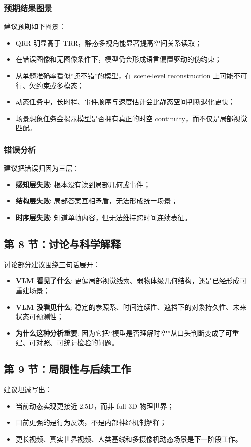 \documentclass[UTF8,12pt,fontset=none]{ctexart}
\begin{document}
\subsubsection{预期结果图景}
建议预期如下图景：
\begin{itemize}
  \item QRR 明显高于 TRR，静态多视角能显著提高空间关系读取；
  \item 在错误图像和无图像条件下，模型仍会形成语言偏置驱动的伪约束；
  \item 从单题准确率看似“还不错”的模型，在 scene-level reconstruction 上可能不可行、欠约束或多模态；
  \item 动态任务中，长时程、事件顺序与速度估计会比静态空间判断退化更快；
  \item 场景想象任务会揭示模型是否拥有真正的时空 continuity，而不仅是局部视觉匹配。
\end{itemize}

\subsubsection{错误分析}
建议把错误归因为三层：
\begin{itemize}
  \item \textbf{感知层失败}: 根本没有读到局部几何或事件；
  \item \textbf{结构层失败}: 局部答案互相矛盾，无法形成统一场景；
  \item \textbf{时序层失败}: 知道单帧内容，但无法维持跨时间连续表征。
\end{itemize}

\subsection{第 8 节：讨论与科学解释}
讨论部分建议围绕三句话展开：
\begin{itemize}
  \item \textbf{VLM 看见了什么}: 更偏局部视觉线索、弱物体级几何结构，还是已经形成可重建场景；
  \item \textbf{VLM 没看见什么}: 稳定的参照系、时间连续性、遮挡下的对象持久性、未来状态可预测性；
  \item \textbf{为什么这种分析重要}: 因为它把“模型是否理解时空”从口头判断变成了可重建、可对照、可统计检验的问题。
\end{itemize}

\subsection{第 9 节：局限性与后续工作}
建议坦诚写出：
\begin{itemize}
  \item 当前动态实现更接近 2.5D，而非 full 3D 物理世界；
  \item 目前更强的是行为反演，不是内部神经机制解释；
  \item 更长视频、真实世界视频、人类基线和多摄像机动态场景是下一阶段工作。
\end{itemize}
\end{document}
